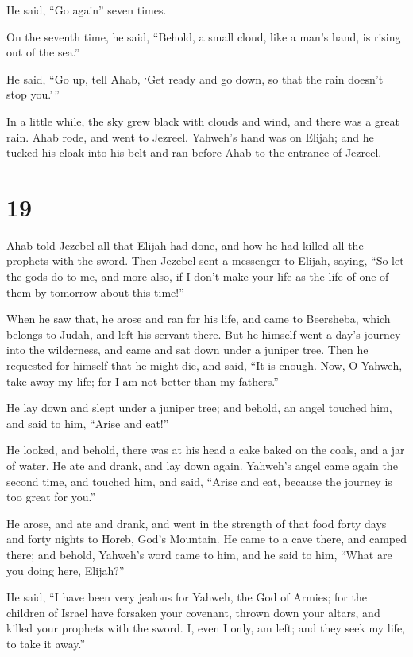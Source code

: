He said, ``Go again'' seven times.

 On the seventh time, he said, ``Behold, a small cloud,
like a man's hand, is rising out of the sea.''

He said, ``Go up, tell Ahab, `Get ready and go down, so that the rain
doesn't stop you.'\,''

 In a little while, the sky grew black with clouds and
wind, and there was a great rain. Ahab rode, and went to Jezreel.
 Yahweh's hand was on Elijah; and he tucked his cloak
into his belt and ran before Ahab to the entrance of Jezreel.

\hypertarget{section-18}{%
\section{19}\label{section-18}}

 Ahab told Jezebel all that Elijah had done, and how he
had killed all the prophets with the sword.  Then Jezebel
sent a messenger to Elijah, saying, ``So let the gods do to me, and more
also, if I don't make your life as the life of one of them by tomorrow
about this time!''

 When he saw that, he arose and ran for his life, and came
to Beersheba, which belongs to Judah, and left his servant there.
 But he himself went a day's journey into the wilderness,
and came and sat down under a juniper tree. Then he requested for
himself that he might die, and said, ``It is enough. Now, O Yahweh, take
away my life; for I am not better than my fathers.''

 He lay down and slept under a juniper tree; and behold,
an angel touched him, and said to him, ``Arise and eat!''

 He looked, and behold, there was at his head a cake baked
on the coals, and a jar of water. He ate and drank, and lay down again.
 Yahweh's angel came again the second time, and touched
him, and said, ``Arise and eat, because the journey is too great for
you.''

 He arose, and ate and drank, and went in the strength of
that food forty days and forty nights to Horeb, God's Mountain.
 He came to a cave there, and camped there; and behold,
Yahweh's word came to him, and he said to him, ``What are you doing
here, Elijah?''

 He said, ``I have been very jealous for Yahweh, the God
of Armies; for the children of Israel have forsaken your covenant,
thrown down your altars, and killed your prophets with the sword. I,
even I only, am left; and they seek my life, to take it away.''

